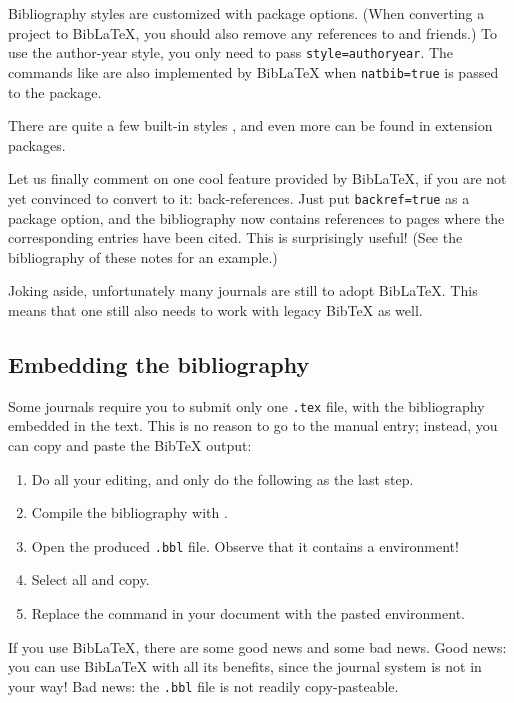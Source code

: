Bibliography styles are customized with package options.
(When converting a project to BibLaTeX,
you should also remove any references to  and friends.)
To use the author-year style, you only need to pass \verb|style=authoryear|.
The  commands like 
are also implemented by BibLaTeX when \verb|natbib=true| is passed to the package.

There are quite a few built-in styles \cite[Section~3.3]{biblatex},
and even more can be found in extension packages.

Let us finally comment on one cool feature provided by BibLaTeX,
if you are not yet convinced to convert to it: back-references.
Just put \verb|backref=true| as a package option,
and the bibliography now contains references to pages where the corresponding entries have been cited.
This is surprisingly useful!
(See the bibliography of these notes for an example.)

\begin{practices}
Joking aside, unfortunately many journals are still to adopt BibLaTeX.
This means that one still also needs to work with legacy BibTeX as well.
\end{practices}


%
\subsection{Embedding the bibliography}

Some journals require you to submit only one \verb|.tex| file,
with the bibliography embedded in the text.
This is no reason to go to the manual entry;
instead, you can copy and paste the BibTeX output:

\begin{enumerate}
\addtocounter{enumi}{-1}
\item Do all your editing, and only do the following as the last step.
\item Compile the bibliography with .
\item Open the produced \verb|.bbl| file.
    Observe that it contains a  environment!
\item Select all and copy.
\item Replace the \verb|| command in your document
    with the pasted environment.
\end{enumerate}

If you use BibLaTeX, there are some good news and some bad news.
Good news: you can use BibLaTeX with all its benefits,
since the journal system is not in your way!
Bad news: the \verb|.bbl| file is not readily copy-pasteable.

